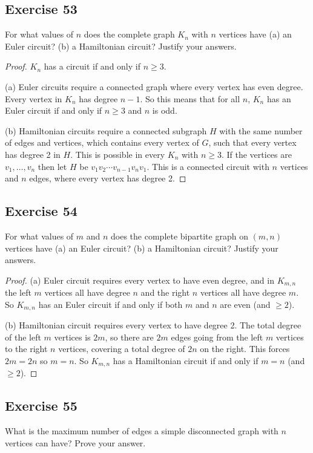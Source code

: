 \documentclass[14pt]{extarticle}
\begin{document}
\subsection{Exercise 53}
For what values of \(n\) does the complete graph \(K_n\) with \(n\) vertices have (a) an Euler circuit? (b) a Hamiltonian 
circuit? Justify your answers.

\begin{proof}
\(K_n\) has a circuit if and only if \(n \geq 3\).

(a) Euler circuits require a connected graph where every vertex has even degree. Every vertex in \(K_n\) has degree 
\(n-1\). So this means that for all \(n\), \(K_n\) has an Euler circuit if and only if \(n \geq 3\) and \(n\) is odd.

(b) Hamiltonian circuits require a connected subgraph \(H\) with the same number of edges and vertices, which contains 
every vertex of \(G\), such that every vertex has degree 2 in \(H\). This is possible in every \(K_n\) with \(n \geq 3\). If
the vertices are \(v_1, \ldots, v_n\) then let \(H\) be \(v_1v_2\cdots v_{n-1}v_nv_1\). This is a connected circuit 
with \(n\) vertices and \(n\) edges, where every vertex has degree 2.
\end{proof}

\subsection{Exercise 54}
For what values of \(m\) and \(n\) does the complete bipartite graph on \((m, n)\) vertices have (a) an Euler circuit? (b) a 
Hamiltonian circuit? Justify your answers.

\begin{proof}
(a) Euler circuit requires every vertex to have even degree, and in \(K_{m,n}\) the left \(m\) vertices all have degree 
\(n\) and the right \(n\) vertices all have degree \(m\). So \(K_{m,n}\) has an Euler circuit if and only if both \(m\) and
\(n\) are even (and \(\geq 2\)).

(b) Hamiltonian circuit requires every vertex to have degree 2. The total degree of the left \(m\) vertices is \(2m\), so
there are \(2m\) edges going from the left \(m\) vertices to the right \(n\) vertices, covering a total degree of \(2n\) on
the right. This forces \(2m = 2n\) so \(m=n\). So \(K_{m,n}\) has a Hamiltonian circuit if and only if \(m=n\) (and \(\geq 2\)).
\end{proof}

\subsection{Exercise 55}
What is the maximum number of edges a simple disconnected graph with \(n\) vertices can have? Prove your answer.
\end{document}
